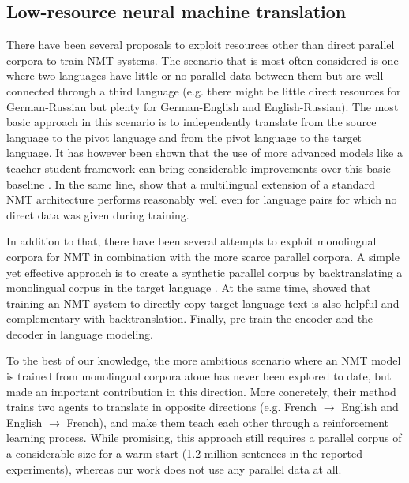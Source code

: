 \documentclass{article} \usepackage{iclr2018_conference,times}
\begin{document}
\subsection{Low-resource neural machine translation} 
\label{subsec:nmt}

There have been several proposals to exploit resources other than direct parallel corpora to train NMT systems. The scenario that is most often considered is one where two languages have little or no parallel data between them but are well connected through a third language (e.g. there might be little direct resources for German-Russian but plenty for German-English and English-Russian). The most basic approach in this scenario is to independently translate from the source language to the pivot language and from the pivot language to the target language. It has however been shown that the use of more advanced models like a teacher-student framework can bring considerable improvements over this basic baseline \citep{firat2016zero,che2017teacher}. In the same line, \citet{johnson2017google} show that a multilingual extension of a standard NMT architecture performs reasonably well even for language pairs for which no direct data was given during training.

In addition to that, there have been several attempts to exploit monolingual corpora for NMT in combination with the more scarce parallel corpora. A simple yet effective approach is to create a synthetic parallel corpus by backtranslating a monolingual corpus in the target language \citep{sennrich2016improving}. At the same time, \citet{currey2017copied} showed that training an NMT system to directly copy target language text is also helpful and complementary with backtranslation. Finally, \citet{ramachandran2017unsupervised} pre-train the encoder and the decoder in language modeling.

To the best of our knowledge, the more ambitious scenario where an NMT model is trained from monolingual corpora alone has never been explored to date, but \citet{he2016dual} made an important contribution in this direction. More concretely, their method trains two agents to translate in opposite directions (e.g. French $\rightarrow$ English and English $\rightarrow$ French), and make them teach each other through a reinforcement learning process. While promising, this approach still requires a parallel corpus of a considerable size for a warm start (1.2 million sentences in the reported experiments), whereas our work does not use any parallel data at all.
\end{document}
